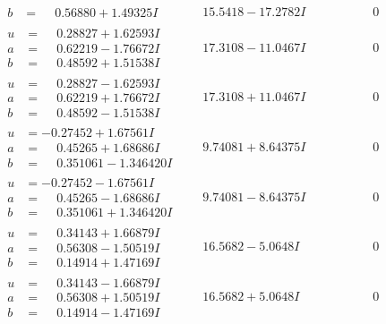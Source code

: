 \documentclass[1p]{elsarticle_modified}
\theoremstyle{definition}
\begin{document}
$$\begin{array}{c|c|c}
\begin{aligned}
b &= \phantom{-}0.56880 + 1.49325 I\end{aligned}
 & \phantom{-}15.5418 - 17.2782 I & \phantom{-0.000000 } 0 \\ \hline\begin{aligned}
u &= \phantom{-}0.28827 + 1.62593 I \\
a &= \phantom{-}0.62219 - 1.76672 I \\
b &= \phantom{-}0.48592 + 1.51538 I\end{aligned}
 & \phantom{-}17.3108 - 11.0467 I & \phantom{-0.000000 } 0 \\ \hline\begin{aligned}
u &= \phantom{-}0.28827 - 1.62593 I \\
a &= \phantom{-}0.62219 + 1.76672 I \\
b &= \phantom{-}0.48592 - 1.51538 I\end{aligned}
 & \phantom{-}17.3108 + 11.0467 I & \phantom{-0.000000 } 0 \\ \hline\begin{aligned}
u &= -0.27452 + 1.67561 I \\
a &= \phantom{-}0.45265 + 1.68686 I \\
b &= \phantom{-}0.351061 - 1.346420 I\end{aligned}
 & \phantom{-}9.74081 + 8.64375 I & \phantom{-0.000000 } 0 \\ \hline\begin{aligned}
u &= -0.27452 - 1.67561 I \\
a &= \phantom{-}0.45265 - 1.68686 I \\
b &= \phantom{-}0.351061 + 1.346420 I\end{aligned}
 & \phantom{-}9.74081 - 8.64375 I & \phantom{-0.000000 } 0 \\ \hline\begin{aligned}
u &= \phantom{-}0.34143 + 1.66879 I \\
a &= \phantom{-}0.56308 - 1.50519 I \\
b &= \phantom{-}0.14914 + 1.47169 I\end{aligned}
 & \phantom{-}16.5682 - 5.0648 I & \phantom{-0.000000 } 0 \\ \hline\begin{aligned}
u &= \phantom{-}0.34143 - 1.66879 I \\
a &= \phantom{-}0.56308 + 1.50519 I \\
b &= \phantom{-}0.14914 - 1.47169 I\end{aligned}
 & \phantom{-}16.5682 + 5.0648 I & \phantom{-0.000000 } 0 \\ \hline\begin{aligned}

\end{aligned}
\end{array}$$
\end{document}
